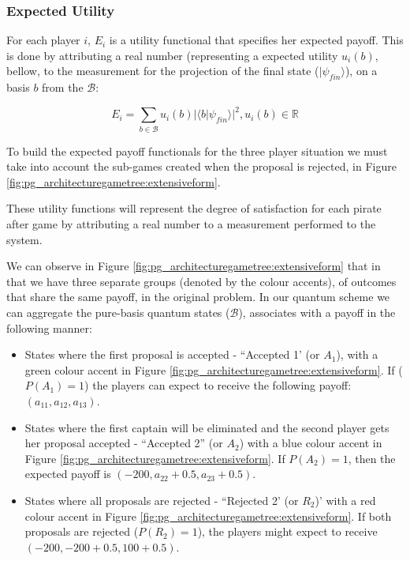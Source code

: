 \documentclass[10pt]{llncs}
\begin{document}
\subsubsection{Expected Utility}
\label{subsec:pirates_utility}

 For each player $i$, $E_{i}$ is a utility functional that
specifies her expected payoff. This is done by attributing a real number (representing a expected utility $ u_{i}(b)$, bellow, to the measurement for the projection of the final state ($\vert\psi_{fin}\rangle$), on a basis $b$ from the $\mathcal{B}$:

\begin{equation}
E_{i}=\sum_{b \in \mathcal{B}} u_{i}(b)\vert \langle b\vert \psi_{fin}\rangle\vert^{2}, u_{i}(b) \in \mathbb{R}
\label{eq:quantum_game_definition_payoff_func}
\end{equation}

To build the expected payoff functionals for the three player situation we must take into account the sub-games created when the proposal is rejected, in Figure \ref{fig:pg_architecturegametree:extensiveform}.


These utility functions will represent the degree of satisfaction for each pirate after game by attributing a real number to a measurement performed to the system.


We can observe in Figure \ref{fig:pg_architecturegametree:extensiveform} that in that we have three separate groups (denoted by the colour accents), of outcomes that share the same payoff, in the original problem. 
In our quantum scheme we can aggregate the pure-basis quantum states ($\mathcal{B}$), associates with a payoff in the following manner: 
\begin{itemize}
\item States where the first proposal is accepted - ``Accepted 1' (or $A_{1}$), with a green colour accent in Figure \ref{fig:pg_architecturegametree:extensiveform}. If ($P(A_{1})=1$) the players can expect to receive the following payoff: $(a_{11}, a_{12}, a_{13})$.

\item States where the first captain will be eliminated and the second player gets her proposal accepted  - ``Accepted 2'' (or $A_{2}$) with a blue colour accent in Figure \ref{fig:pg_architecturegametree:extensiveform}. If $P(A_{2})=1$, then the expected payoff is $(-200, a_{22}+0.5, a_{23}+0.5)$.

\item States where all proposals are rejected  - ``Rejected 2' (or $R_{2}$)' with a red colour accent in Figure \ref{fig:pg_architecturegametree:extensiveform}. If both proposals are rejected ($P(R_{2})= 1$), the players might expect to receive $(-200, -200+0.5, 100+0.5)$.

\end{itemize}
\end{document}
